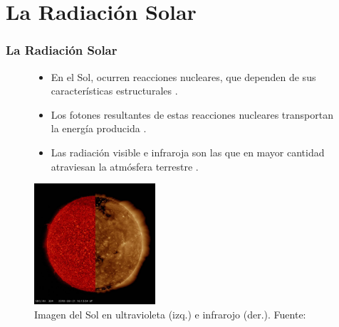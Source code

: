 \documentclass{beamer}
\begin{document}
\section{La Radiación Solar}
\begin{frame}
   \frametitle{La Radiación Solar}
   \begin{figure}[h!]
   \begin{minipage}{0.4\textwidth}
   \begin{flushleft}
   \begin{itemize}
      \item\scriptsize En el Sol, ocurren reacciones nucleares, que dependen de sus características estructurales \cite{duffie2013solar}.
      \item\scriptsize Los fotones resultantes de estas reacciones nucleares transportan la energía producida \cite{fisicasol}. 
      \item\scriptsize Las radiación visible e infraroja son las que en mayor cantidad atraviesan la atmósfera terrestre \cite{duffie2013solar}. 
   \end{itemize}
   \end{flushleft} 
   \end{minipage}
   \begin{minipage}{0.5\textwidth}
      \centering \includegraphics[width=4.5cm, height=4.5cm]{radiacion_solar}
      \caption{\tiny Imagen del Sol en ultravioleta (izq.) e infrarojo (der.). Fuente: }
   \end{minipage}
   \end{figure}
\end{frame}

\end{document}
